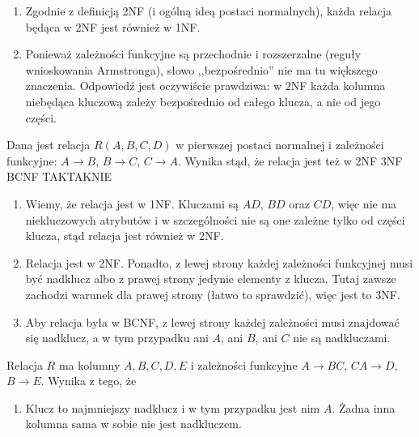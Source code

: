\begin{solutions}
\begin{enumerate}[\bf A.]
    	\item Zgodnie z definicją 2NF (i ogólną ideą postaci normalnych), każda relacja będąca w 2NF jest również w 1NF.
    	
    	\item Ponieważ zależności funkcyjne są przechodnie i rozszerzalne (reguły wnioskowania Armstronga), słowo ,,bezpośrednio'' nie ma tu większego znaczenia. Odpowiedź jest oczywiście prawdziwa: w 2NF każda kolumna niebędąca kluczową zależy bezpośrednio od całego klucza, a nie od jego części.
    \end{enumerate}
    
    \sol Dana jest relacja $R(A, B, C, D)$ w pierwszej postaci normalnej i zależności funkcyjne: $A \rightarrow B$, $B \rightarrow C$, $C \rightarrow A$. Wynika stąd, że relacja jest też w
    \answerss
    {2NF}
    {3NF}
    {BCNF}
    {TAK}{TAK}{NIE}
    
    \begin{enumerate}[\bf A.]
    	\item Wiemy, że relacja jest w 1NF. Kluczami są $AD$, $BD$ oraz $CD$, więc nie ma niekluczowych atrybutów i w szczególności nie są one zależne tylko od części klucza, stąd relacja jest również w 2NF.
    	
    	\item Relacja jest w 2NF. Ponadto, z lewej strony każdej zależności funkcyjnej musi być nadklucz albo z prawej strony jedynie elementy z klucza. Tutaj zawsze zachodzi warunek dla prawej strony (łatwo to sprawdzić), więc jest to 3NF.
    	
    	\item Aby relacja była w BCNF, z lewej strony każdej zależności musi znajdować się nadklucz, a w tym przypadku ani $A$, ani $B$, ani $C$ nie są nadkluczami.
    \end{enumerate}

    \sol Relacja $R$ ma kolumny $A,B,C,D,E$ i zależności funkcyjne $A\rightarrow BC$, $CA\rightarrow D$, $B\rightarrow E$. Wynika z tego, że
    
    \begin{enumerate}[\bf A.]
    	\item Klucz to najmniejszy nadklucz i w tym przypadku jest nim $A$. Żadna inna kolumna sama w sobie nie jest nadkluczem.
    	

\end{enumerate}
\end{solutions}
